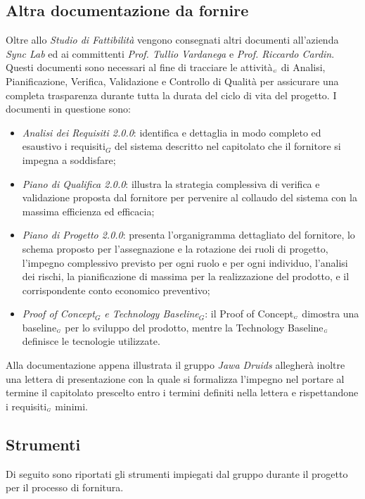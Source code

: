 \subsection{Altra documentazione da fornire}\label{ProcessiPrimariFornituraAltraDocumentazioneDaFornire}
Oltre allo \textit{Studio di Fattibilità} vengono consegnati altri documenti all'azienda \textit{Sync Lab} ed ai committenti \textit{Prof. Tullio Vardanega} e \textit{Prof. Riccardo Cardin}. Questi documenti sono necessari al fine di tracciare le attività$_{\scaleto{G}{3pt}}$ di Analisi, Pianificazione, Verifica, Validazione e Controllo di Qualità per assicurare una completa trasparenza durante tutta la durata del ciclo di vita del progetto.
I documenti in questione sono:
\begin{itemize}
	\item \textit{Analisi dei Requisiti 2.0.0}: identifica e dettaglia in modo completo ed esaustivo i requisiti$_G$ del sistema descritto nel capitolato che il fornitore si impegna a soddisfare;
	\item \textit{Piano di Qualifica 2.0.0}: illustra la strategia complessiva di verifica e validazione proposta dal fornitore per pervenire al collaudo del sistema con la massima efficienza ed efficacia;
	\item \textit{Piano di Progetto 2.0.0}: presenta l'organigramma dettagliato del fornitore, lo schema proposto per l'assegnazione e la rotazione dei ruoli di progetto, l'impegno complessivo previsto per ogni ruolo e per ogni individuo, l'analisi dei rischi, la pianificazione di massima per la realizzazione del prodotto, e il corrispondente conto economico preventivo;
	\item \textit{Proof of Concept$_G$ e Technology Baseline$_G$}: il Proof of Concept$_{\scaleto{G}{3pt}}$ dimostra una baseline$_{\scaleto{G}{3pt}}$ per lo sviluppo del prodotto, mentre la Technology Baseline$_{\scaleto{G}{3pt}}$ definisce le tecnologie utilizzate. 
\end{itemize}
Alla documentazione appena illustrata il gruppo \textit{Jawa Druids} allegherà inoltre una lettera di presentazione con la quale si formalizza l'impegno nel portare al termine il capitolato prescelto entro i termini definiti nella lettera e rispettandone i requisiti$_{\scaleto{G}{3pt}}$ minimi.
\subsection{Strumenti}\label{ProcessiPrimariFornituraStrumenti}
Di seguito sono riportati gli strumenti impiegati dal gruppo durante il progetto per il processo di fornitura.
